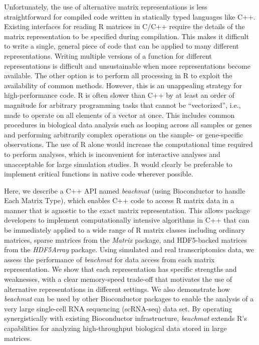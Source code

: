 \documentclass[10pt,letterpaper]{article}
\newcommand{\beachmat}{\textit{beachmat}}
\begin{document}
Unfortunately, the use of alternative matrix representations is less straightforward for compiled code written in statically typed languages like C++.
Existing interfaces for reading R matrices in C/C++ require the details of the matrix representation to be specified during compilation.
This makes it difficult to write a single, general piece of code that can be applied to many different representations.
Writing multiple versions of a function for different representations is difficult and unsustainable when more representations become available.
The other option is to perform all processing in R to exploit the availability of common methods.
However, this is an unappealing strategy for high-performance code.
R is often slower than C++ by at least an order of magnitude for arbitrary programming tasks that cannot be ``vectorized'', i.e., made to operate on all elements of a vector at once.
This includes common procedures in biological data analysis such as looping across all samples or genes and performing arbitrarily complex operations on the sample- or gene-specific observations.
The use of R alone would increase the computational time required to perform analyses, which is inconvenient for interactive analyses and unacceptable for large simulation studies.
It would clearly be preferable to implement critical functions in native code wherever possible.


Here, we describe a C++ API named \beachmat{} (using Bioconductor to handle Each Matrix Type), which enables C++ code to access R matrix data in a manner that is agnostic to the exact matrix representation.
This allows package developers to implement computationally intensive algorithms in C++ that can be immediately applied to a wide range of R matrix classes including ordinary matrices, sparse matrices from the \textit{Matrix} package, and HDF5-backed matrices from the \textit{HDF5Array} package.
Using simulated and real transcriptomics data, we assess the performance of \beachmat{} for data access from each matrix representation.
We show that each representation has specific strengths and weaknesses, with a clear memory-speed trade-off that motivates the use of alternative representations in different settings.
We also demonstrate how \beachmat{} can be used by other Bioconductor packages to enable the analysis of a very large single-cell RNA sequencing (scRNA-seq) data set. 
By operating synergistically with existing Bioconductor infrastructure, \beachmat{} extends R's capabilities for analyzing high-throughput biological data stored in large matrices.
\end{document}
